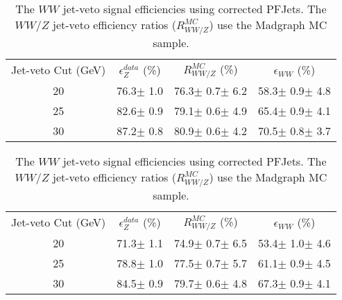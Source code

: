 \begin{table}[htbp]
\caption{The $WW$ jet-veto signal efficiencies using uncorrected PFJets. 
The $WW/Z$ jet-veto efficiency ratios ($R_{WW/Z}^{MC}$) use the Madgraph MC sample.}
\begin{center}
\label{tab:wweff_results}
\begin{tabular}{c|cc|c}
\hline
\hline
Jet-veto Cut (GeV) & $\epsilon_Z^{data}$ (\%) & $R_{WW/Z}^{MC}$ (\%) & $\epsilon_{WW}$ (\%) \\
    20 &   76.3$\pm$ 1.0 &   76.3$\pm$ 0.7$\pm$ 6.2 &   58.3$\pm$ 0.9$\pm$ 4.8 \\
    25 &   82.6$\pm$ 0.9 &   79.1$\pm$ 0.6$\pm$ 4.9 &   65.4$\pm$ 0.9$\pm$ 4.1 \\
    30 &   87.2$\pm$ 0.8 &   80.9$\pm$ 0.6$\pm$ 4.2 &   70.5$\pm$ 0.8$\pm$ 3.7 \\
\hline
\hline
\end{tabular}
\end{center}
\caption{The $WW$ jet-veto signal efficiencies using corrected PFJets.
The $WW/Z$ jet-veto efficiency ratios ($R_{WW/Z}^{MC}$) use the Madgraph MC sample.
}
\begin{center}
\label{tab:wweff_jec_results}
\begin{tabular}{c|cc|c}
\hline
\hline
Jet-veto Cut (GeV) & $\epsilon_Z^{data}$ (\%) & $R_{WW/Z}^{MC}$ (\%) & $\epsilon_{WW}$ (\%) \\
    20 &   71.3$\pm$ 1.1 &   74.9$\pm$ 0.7$\pm$ 6.5 &   53.4$\pm$ 1.0$\pm$ 4.6 \\
    25 &   78.8$\pm$ 1.0 &   77.5$\pm$ 0.7$\pm$ 5.7 &   61.1$\pm$ 0.9$\pm$ 4.5 \\
    30 &   84.5$\pm$ 0.9 &   79.7$\pm$ 0.6$\pm$ 4.8 &   67.3$\pm$ 0.9$\pm$ 4.1 \\
\hline
\hline
\end{tabular}
\end{center}
\end{table}
